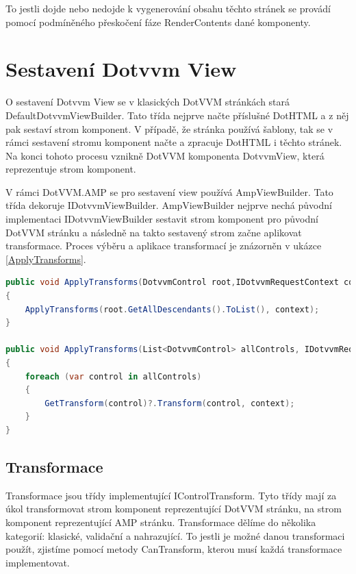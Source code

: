  To jestli dojde nebo nedojde k vygenerování obsahu těchto stránek se provádí pomocí podmíněného přeskočení fáze RenderContents dané komponenty.
 
\section{Sestavení Dotvvm View}
O sestavení Dotvvm View se v klasických DotVVM stránkách stará DefaultDotvvmViewBuilder. Tato třída nejprve načte příslušné DotHTML a z něj pak sestaví strom komponent. V případě, že stránka používá šablony, tak se v rámci sestavení stromu komponent načte a zpracuje DotHTML i těchto stránek. Na konci tohoto procesu vznikně DotVVM komponenta  DotvvmView, která reprezentuje strom komponent.

V rámci DotVVM.AMP se pro sestavení view používá AmpViewBuilder. Tato třída dekoruje IDotvvmViewBuilder. AmpViewBuilder nejprve nechá původní implementaci IDotvvmViewBuilder sestavit strom komponent pro původní DotVVM stránku a následně na takto sestavený strom začne aplikovat transformace. Proces výběru a aplikace transformací je znázorněn v ukázce \ref{ApplyTransforms}. 
\begin{lstlisting}[language=c#, caption= Ukázka aplikace transformací ,label=ApplyTransforms,captionpos=t]
public void ApplyTransforms(DotvvmControl root,IDotvvmRequestContext context)
{
    ApplyTransforms(root.GetAllDescendants().ToList(), context);
}

public void ApplyTransforms(List<DotvvmControl> allControls, IDotvvmRequestContext context)
{
    foreach (var control in allControls)
    {
        GetTransform(control)?.Transform(control, context);
    }
}
\end{lstlisting}
\subsection*{Transformace}
Transformace jsou třídy implementující IControlTransform. Tyto třídy mají za úkol transformovat strom komponent reprezentující DotVVM stránku, na strom komponent reprezentující AMP stránku. Transformace dělíme do několika kategorií: klasické, validační a nahrazující. To jestli je možné danou transformaci použít, zjistíme pomocí metody CanTransform, kterou musí každá transformace implementovat.

